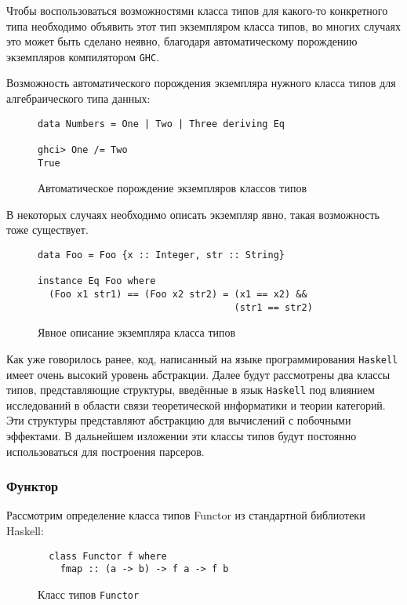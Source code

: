 Чтобы воспользоваться возможностями класса типов для какого-то конкретного типа необходимо объявить этот тип экземпляром класса типов, во многих случаях это может быть сделано неявно, благодаря автоматическому порождению экземпляров компилятором \lstinline{GHC}.

Возможность автоматического порождения экземпляра нужного класса типов для алгебраического типа данных:
\begin{figure}[h]
\begin{lstlisting}
data Numbers = One | Two | Three deriving Eq

ghci> One /= Two
True  
\end{lstlisting}
\caption{Автоматическое порождение экземпляров классов типов}
\label{listing:List}
\end{figure}


В некоторых случаях необходимо описать экземпляр явно, такая возможность тоже существует.

\begin{figure}[h]
\begin{lstlisting}
data Foo = Foo {x :: Integer, str :: String}

instance Eq Foo where
  (Foo x1 str1) == (Foo x2 str2) = (x1 == x2) && 
                                   (str1 == str2)
\end{lstlisting}
\caption{Явное описание экземпляра класса типов}
\label{listing:Instance}
\end{figure}

Как уже говорилось ранее, код, написанный на языке программирования \lstinline{Haskell} имеет очень высокий уровень абстракции. Далее будут рассмотрены два классы типов, представляющие структуры, введённые в язык \lstinline{Haskell} под влиянием исследований в области связи теоретической информатики и теории категорий. Эти структуры представляют абстракцию для вычислений с побочными эффектами. В дальнейшем изложении эти классы типов будут постоянно использоваться для построения парсеров. 

\subsubsection{Функтор}

Рассмотрим определение класса типов Functor из стандартной библиотеки Haskell:

\begin{figure}[h]
\begin{lstlisting}
  class Functor f where
    fmap :: (a -> b) -> f a -> f b
\end{lstlisting}
\caption{Класс типов \lstinline{Functor}}
\label{listing:Functor}
\end{figure}

